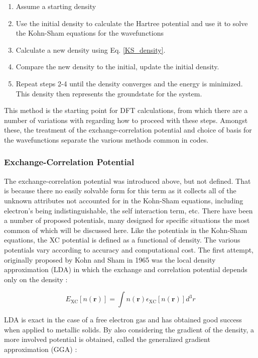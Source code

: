 \begin{enumerate}
	\item Assume a starting density
	\item Use the initial density to calculate the Hartree potential and use it to solve the Kohn-Sham equations for the wavefunctions
	\item Calculate a new density using Eq. \ref{KS_density}.
	\item Compare the new density to the initial, update the initial density. 
	\item Repeat steps 2-4 until the density converges and the energy is minimized. This density then represents the groundstate for the system.
\end{enumerate}

This method is the starting point for DFT calculations, from which there are a number of  variations with regarding how to proceed with these steps.  Amongst these, the treatment of the exchange-correlation potential and choice of basis for the wavefunctions separate the various methods common in codes.  


\subsubsection{Exchange-Correlation Potential}
The exchange-correlation potential was introduced above, but not defined.  That is because there no easily solvable form for this term as it collects all of the unknown attributes not accounted for in the Kohn-Sham equations, including electron's being indistinguishable, the self interaction term, etc.   There have been a number of proposed potentials, many designed for specific situations the most common of which will be discussed here.  Like the potentials in the Kohn-Sham equations, the XC potential is defined as a functional of density.  The various potentials vary according to accuracy and computational cost.  The first attempt, originally proposed by Kohn and Sham in 1965 was the local density approximation (LDA) in which the exchange and correlation potential depends only on the density \cite{tao_climbing_2003, ks_1965}: 

\begin{equation}
	E_{\mathrm{XC}}[n(\textbf{r})] = \int  n(\textbf{r}) \epsilon_{\mathrm{XC}}[n(\textbf{r})] d^3r
\end{equation}

LDA is exact in the case of a free electron gas and has obtained good success when applied to metallic solids.  By also considering the gradient of the density, a more involved potential is obtained, called the generalized gradient approximation (GGA) \cite{tao_climbing_2003,perdew_wang} : 



